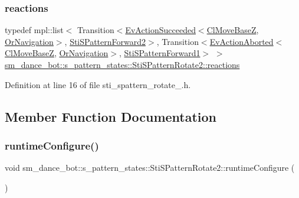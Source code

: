 \subsubsection{\texorpdfstring{reactions}{reactions}}
{\footnotesize\ttfamily typedef mpl\+::list$<$ Transition$<$\hyperlink{structsmacc_1_1default__events_1_1EvActionSucceeded}{Ev\+Action\+Succeeded}$<$\hyperlink{classcl__move__base__z_1_1ClMoveBaseZ}{Cl\+Move\+BaseZ}, \hyperlink{classsm__dance__bot_1_1OrNavigation}{Or\+Navigation}$>$, \hyperlink{structsm__dance__bot_1_1s__pattern__states_1_1StiSPatternForward2}{Sti\+S\+Pattern\+Forward2}$>$, Transition$<$\hyperlink{structsmacc_1_1default__events_1_1EvActionAborted}{Ev\+Action\+Aborted}$<$\hyperlink{classcl__move__base__z_1_1ClMoveBaseZ}{Cl\+Move\+BaseZ}, \hyperlink{classsm__dance__bot_1_1OrNavigation}{Or\+Navigation}$>$, \hyperlink{structsm__dance__bot_1_1s__pattern__states_1_1StiSPatternForward1}{Sti\+S\+Pattern\+Forward1}$>$ $>$ \hyperlink{structsm__dance__bot_1_1s__pattern__states_1_1StiSPatternRotate2_a8408b6f8b356b536b1ebe328ba6f7b02}{sm\+\_\+dance\+\_\+bot\+::s\+\_\+pattern\+\_\+states\+::\+Sti\+S\+Pattern\+Rotate2\+::reactions}}



Definition at line 16 of file sti\+\_\+spattern\+\_\+rotate\+\_.\+h.



\subsection{Member Function Documentation}
\mbox{\label{structsm__dance__bot_1_1s__pattern__states_1_1StiSPatternRotate2_a26cebb32aecbbbfe02fe9c56947d24a7}} 
\subsubsection{\texorpdfstring{runtime\+Configure()}{runtimeConfigure()}}
{\footnotesize\ttfamily void sm\+\_\+dance\+\_\+bot\+::s\+\_\+pattern\+\_\+states\+::\+Sti\+S\+Pattern\+Rotate2\+::runtime\+Configure (\begin{DoxyParamCaption}{ }\end{DoxyParamCaption})\hspace{0.3cm}{\ttfamily [inline]}}



